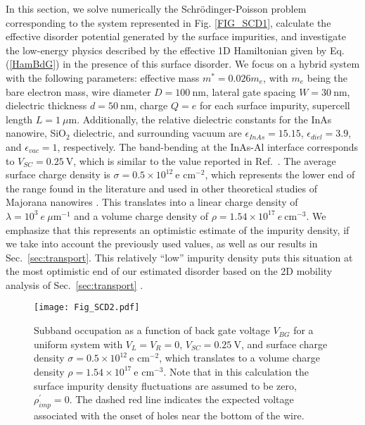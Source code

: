\documentclass[aps,prmaterials,twocolumn,superscriptaddress,longbibliography]{revtex4-2}
\begin{document}
In this section, we solve numerically the  Schr{\"o}dinger-Poisson problem corresponding to the system represented  in Fig. \ref{FIG_SCD1}, calculate the effective disorder potential generated by the surface impurities, and investigate the low-energy physics described by the effective 1D Hamiltonian given by Eq. (\ref{HamBdG}) in the presence of this surface disorder. We focus on a hybrid system with the following parameters: effective mass  $m^* = 0.026 m_e$, with $m_e$ being the bare electron mass, wire diameter $D = 100~\text{nm}$, lateral gate spacing $W = 30~\text{nm}$, dielectric thickness $d = 50~\text{nm}$, charge $Q = e$ for each surface impurity,  supercell length $L = 1~\mu\text{m}$. Additionally, the relative dielectric constants for the InAs nanowire, SiO$_2$  dielectric, and surrounding vacuum are $\epsilon_{InAs}=15.15$, $\epsilon_{diel}=3.9$, and $\epsilon_{vac} = 1$, respectively. The band-bending at the InAs-Al interface corresponds to $V_{SC} = 0.25~\text{V}$, which is similar to the value  reported in Ref.~. The average surface charge density is $\sigma = 0.5 \times 10^{12}~\text{e cm}^{-2}$, which represents the lower end of the range found in the literature \cite{olsson1996charge} and used in other theoretical studies of Majorana nanowires \cite{winkler2019unified,escribano2019effects,woods2020subband,liu2021electronic}. This translates into a linear charge density of $\lambda = 10^{3}~ e ~ \mu\text{m}^{-1}$ and a volume charge density of $\rho = 1.54 \times 10^{17}~e~\text{cm}^{-3}$. We emphasize that this represents an optimistic estimate of the impurity density, if we take into account  the previously used values, as well as our results in Sec.~\ref{sec:transport}. This relatively ``low'' impurity density puts this situation at the most optimistic end of our estimated disorder based on the 2D mobility analysis of Sec.~\ref{sec:transport} .

\begin{figure}[t]
    \begin{center}
    \texttt{[image: Fig\_SCD2.pdf]}
    \end{center}
    \vspace{-.5cm}
    \caption{Subband occupation as a function of back gate voltage $V_{BG}$ for a uniform system with  $V_L = V_R = 0$, $V_{SC} = 0.25~\text{V}$, and surface charge density $\sigma = 0.5 \times 10^{12}~\text{e cm}^{-2}$, which translates to a volume charge density $\rho = 1.54 \times 10^{17}~\text{e cm}^{-3}$. Note that in this calculation the surface impurity density fluctuations are assumed to be zero, $\rho^\prime_{imp}=0$. The dashed red line indicates the expected voltage associated with the onset of holes near the bottom of the wire.}
    \label{FIG_SCD2}
    \vspace{-1mm}
\end{figure}
\end{document}

